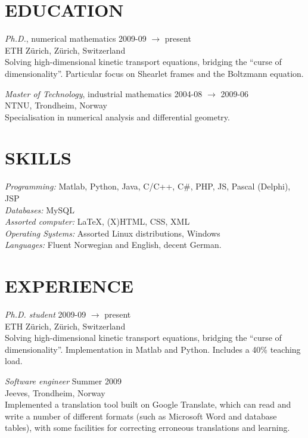\documentclass[line,margin]{res}
\newcommand{\zh}{Z\"{u}rich}
\begin{document}
\address{Forchstrasse 168, CH-8032 \zh}
\address{+41 78 634 68 37}


\begin{resume}

\section{EDUCATION} 
    {\em Ph.D.}, numerical mathematics \hfill 2009-09 $\to$ present \\
    ETH \zh, \zh, Switzerland \\
    Solving high-dimensional kinetic transport equations, bridging the ``curse
    of dimensionality''. Particular focus on Shearlet frames and the Boltzmann
    equation.

    {\em Master of Technology}, industrial mathematics \hfill 2004-08 $\to$ 2009-06 \\
    NTNU, Trondheim, Norway \\
    Specialisation in numerical analysis and differential geometry.


\section{SKILLS}
    {\em Programming:} Matlab, Python, Java, C/C++, C\#, PHP, JS, 
        Pascal (Delphi), JSP \\
    {\em Databases:} MySQL \\
    {\em Assorted computer:} \LaTeX, (X)HTML, CSS, XML \\
    {\em Operating Systems:} Assorted Linux distributions, Windows \\
    {\em Languages:} Fluent Norwegian and English, decent German.


\section{EXPERIENCE} 
    {\em Ph.D. student} \hfill 2009-09 $\to$ present \\
    ETH \zh, \zh, Switzerland \\
    Solving high-dimensional kinetic transport equations, bridging the ``curse
    of dimensionality''.  Implementation in Matlab and Python. Includes a 40\%
    teaching load.

    {\em Software engineer} \hfill Summer 2009 \\
    Jeeves, Trondheim, Norway \\
    Implemented a translation tool built on Google Translate, which can read and
    write a number of different formats (such as Microsoft Word and database
    tables), with some facilities for correcting erroneous translations and
    learning.


\end{resume}
\end{document}
